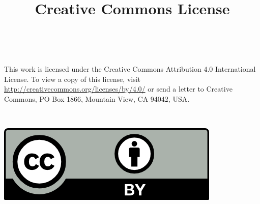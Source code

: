 \begin{flushleft}
\title{\Large\textbf{Creative Commons License}}\\
\end{flushleft}
{

\large This work is licensed under the Creative Commons Attribution 4.0 International License. To view a copy of this license, visit \url{http://creativecommons.org/licenses/by/4.0/} or send a letter to Creative Commons, PO Box 1866, Mountain View, CA 94042, USA.
}\\

\begin{center}

\includegraphics{by.png}

\end{center}